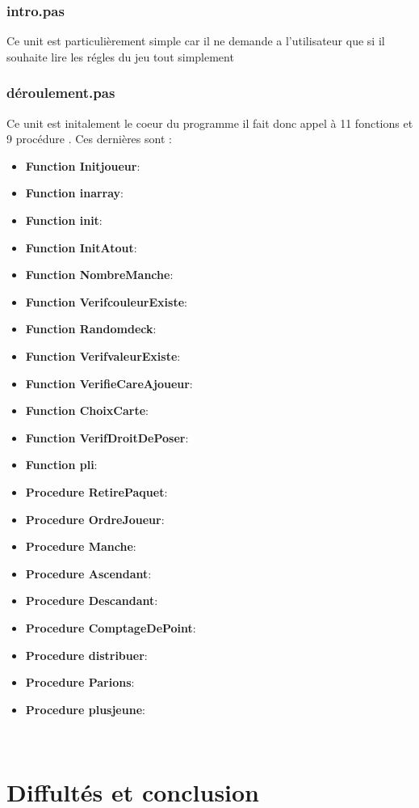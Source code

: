 \documentclass[12pt]{report}
\begin{document}
\begin{itemize}
   	\subsubsection{intro.pas}
   	Ce unit est particulièrement simple car il ne demande a l'utilisateur que si il souhaite lire les régles du jeu tout simplement 
 	\subsubsection{déroulement.pas}
  Ce unit est initalement le coeur du programme il fait donc appel à 11 fonctions et 9 procédure . Ces dernières sont :
  \begin{itemize}
  
  
  \item \textbf{Function Initjoueur}:
  \item \textbf{Function inarray}:
  \item \textbf{Function init}:
  \item \textbf{Function InitAtout}:
  \item \textbf{Function NombreManche}:
  \item \textbf{Function VerifcouleurExiste}:
  \item \textbf{Function Randomdeck}:
  \item \textbf{Function VerifvaleurExiste}:
  \item \textbf{Function VerifieCareAjoueur}:
  \item \textbf{Function ChoixCarte}:
  \item \textbf{Function VerifDroitDePoser}:
  \item \textbf{Function pli}:
  \item \textbf{Procedure RetirePaquet}:
  \item \textbf{Procedure OrdreJoueur}:
  \item \textbf{Procedure Manche}:
  \item \textbf{Procedure Ascendant}:
  \item \textbf{Procedure Descandant}:
  \item \textbf{Procedure ComptageDePoint}:
  \item \textbf{Procedure distribuer}:
  \item \textbf{Procedure Parions}:
  \item \textbf{Procedure plusjeune}:
  \end{itemize}
  \\
  

\section{Diffultés et conclusion}

			
	\end{itemize}
\end{document}
